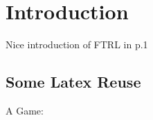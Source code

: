 
\chapter{Introduction}\label{chapter:introduction}

Nice introduction of FTRL in \cite{flokas} p.1

\section{Some Latex Reuse}

A Game: 


